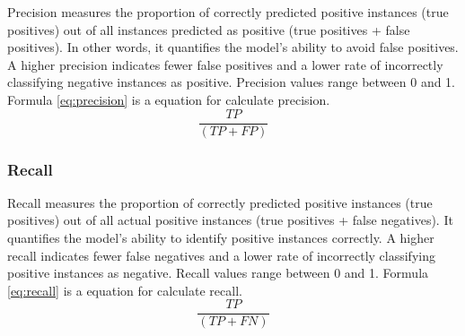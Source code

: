 Precision measures the proportion of correctly predicted positive instances (true positives) out of all instances predicted as positive (true positives + false positives). In other words, it quantifies the model's ability to avoid false positives. A higher precision indicates fewer false positives and a lower rate of incorrectly classifying negative instances as positive.
Precision values range between 0 and 1. Formula \ref{eq:precision} is a equation for calculate precision.
\begin{equation}
  \label{eq:precision}
  \frac{TP}{(TP+FP)}
\end{equation}

\subsubsection{Recall}
\label{subsubsec:recall}

Recall measures the proportion of correctly predicted positive instances (true positives) out of all actual positive instances (true positives + false negatives). It quantifies the model's ability to identify positive instances correctly. A higher recall indicates fewer false negatives and a lower rate of incorrectly classifying positive instances as negative.
Recall values range between 0 and 1. Formula \ref{eq:recall} is a equation for calculate recall.
\begin{equation}
  \label{eq:recall}
  \frac{TP}{(TP+FN)}
\end{equation}